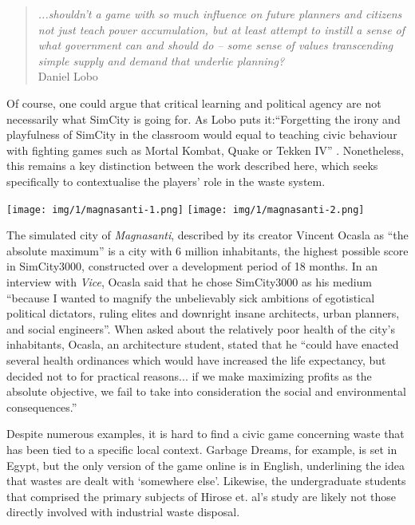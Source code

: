\documentclass[nofonts,nols,justified,nobib]{tufte-book}
\begin{document}
\begin{quote}
\emph{...shouldn’t a game with so much influence on future planners and citizens not just teach power accumulation, but at least attempt to instill a sense of what government can and should do -- some sense of values transcending simple supply and demand that underlie planning?} \cite{lobo_city_2004}\\
Daniel Lobo
\end{quote}

Of course, one could argue that critical learning and political agency are not necessarily what SimCity is going for. As Lobo puts it:``Forgetting the irony and playfulness of SimCity in the classroom would equal to teaching civic behaviour with fighting games such as Mortal Kombat, Quake or Tekken IV'' \cite{lobo_city_2004}. Nonetheless, this remains a key distinction between the work described here, which seeks specifically to contextualise the players' role in the waste system.

\begin{marginfigure}
\texttt{[image: img/1/magnasanti-1.png]}
\texttt{[image: img/1/magnasanti-2.png]}
\caption{The simulated city of \emph{Magnasanti}, described by its creator Vincent Ocasla as ``the absolute maximum'' is a city with 6 million inhabitants, the highest possible score in SimCity3000, constructed over a development period of 18 months. In an interview with \emph{Vice}, Ocasla said that he chose SimCity3000 as his medium ``because I wanted to magnify the unbelievably sick ambitions of egotistical political dictators, ruling elites and downright insane architects, urban planners, and social engineers''. When asked about the relatively poor health of the city's inhabitants, Ocasla, an architecture student, stated that he ``could have enacted several health ordinances which would have increased the life expectancy, but decided not to for practical reasons... if we make maximizing profits as the absolute objective, we fail to take into consideration the social and environmental consequences.''\cite{sterry_totalitarian_2010}}
\end{marginfigure}

Despite numerous examples, it is hard to find a civic game concerning waste that has been tied to a specific local context. Garbage Dreams, for example, is set in Egypt, but the only version of the game online is in English, underlining the idea that wastes are dealt with `somewhere else'. Likewise, the undergraduate students that comprised the primary subjects of Hirose et. al's study are likely not those directly involved with industrial waste disposal. 
\end{document}

